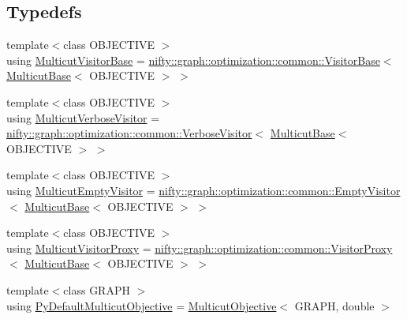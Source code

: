 \subsection*{Typedefs}
\begin{DoxyCompactItemize}
\item 
{\footnotesize template$<$class O\+B\+J\+E\+C\+T\+I\+V\+E $>$ }\\using \hyperlink{namespacenifty_1_1graph_1_1optimization_1_1multicut_ac347ba5e0f64a15fd2ad835dfc727b2b}{Multicut\+Visitor\+Base} = \hyperlink{classnifty_1_1graph_1_1optimization_1_1common_1_1VisitorBase}{nifty\+::graph\+::optimization\+::common\+::\+Visitor\+Base}$<$ \hyperlink{classnifty_1_1graph_1_1optimization_1_1multicut_1_1MulticutBase}{Multicut\+Base}$<$ O\+B\+J\+E\+C\+T\+I\+V\+E $>$ $>$
\item 
{\footnotesize template$<$class O\+B\+J\+E\+C\+T\+I\+V\+E $>$ }\\using \hyperlink{namespacenifty_1_1graph_1_1optimization_1_1multicut_a071c9020e064373e9c11465fbe1870f9}{Multicut\+Verbose\+Visitor} = \hyperlink{classnifty_1_1graph_1_1optimization_1_1common_1_1VerboseVisitor}{nifty\+::graph\+::optimization\+::common\+::\+Verbose\+Visitor}$<$ \hyperlink{classnifty_1_1graph_1_1optimization_1_1multicut_1_1MulticutBase}{Multicut\+Base}$<$ O\+B\+J\+E\+C\+T\+I\+V\+E $>$ $>$
\item 
{\footnotesize template$<$class O\+B\+J\+E\+C\+T\+I\+V\+E $>$ }\\using \hyperlink{namespacenifty_1_1graph_1_1optimization_1_1multicut_afabf492f6831ee43b16508cb78726be8}{Multicut\+Empty\+Visitor} = \hyperlink{classnifty_1_1graph_1_1optimization_1_1common_1_1EmptyVisitor}{nifty\+::graph\+::optimization\+::common\+::\+Empty\+Visitor}$<$ \hyperlink{classnifty_1_1graph_1_1optimization_1_1multicut_1_1MulticutBase}{Multicut\+Base}$<$ O\+B\+J\+E\+C\+T\+I\+V\+E $>$ $>$
\item 
{\footnotesize template$<$class O\+B\+J\+E\+C\+T\+I\+V\+E $>$ }\\using \hyperlink{namespacenifty_1_1graph_1_1optimization_1_1multicut_a555d6507d0e1cd8784e707a184448412}{Multicut\+Visitor\+Proxy} = \hyperlink{classnifty_1_1graph_1_1optimization_1_1common_1_1VisitorProxy}{nifty\+::graph\+::optimization\+::common\+::\+Visitor\+Proxy}$<$ \hyperlink{classnifty_1_1graph_1_1optimization_1_1multicut_1_1MulticutBase}{Multicut\+Base}$<$ O\+B\+J\+E\+C\+T\+I\+V\+E $>$ $>$
\item 
{\footnotesize template$<$class G\+R\+A\+P\+H $>$ }\\using \hyperlink{namespacenifty_1_1graph_1_1optimization_1_1multicut_a042a3be071d462ac11c49605edba1700}{Py\+Default\+Multicut\+Objective} = \hyperlink{classnifty_1_1graph_1_1optimization_1_1multicut_1_1MulticutObjective}{Multicut\+Objective}$<$ G\+R\+A\+P\+H, double $>$
\end{DoxyCompactItemize}
